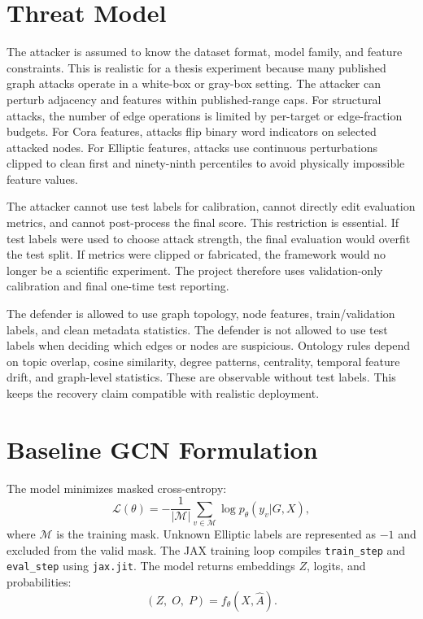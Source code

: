 \documentclass[12pt,oneside]{report}
\begin{document}
\section{Threat Model}
The attacker is assumed to know the dataset format, model family, and feature constraints. This is realistic for a thesis experiment because many published graph attacks operate in a white-box or gray-box setting. The attacker can perturb adjacency and features within published-range caps. For structural attacks, the number of edge operations is limited by per-target or edge-fraction budgets. For Cora features, attacks flip binary word indicators on selected attacked nodes. For Elliptic features, attacks use continuous perturbations clipped to clean first and ninety-ninth percentiles to avoid physically impossible feature values.

The attacker cannot use test labels for calibration, cannot directly edit evaluation metrics, and cannot post-process the final score. This restriction is essential. If test labels were used to choose attack strength, the final evaluation would overfit the test split. If metrics were clipped or fabricated, the framework would no longer be a scientific experiment. The project therefore uses validation-only calibration and final one-time test reporting.

The defender is allowed to use graph topology, node features, train/validation labels, and clean metadata statistics. The defender is not allowed to use test labels when deciding which edges or nodes are suspicious. Ontology rules depend on topic overlap, cosine similarity, degree patterns, centrality, temporal feature drift, and graph-level statistics. These are observable without test labels. This keeps the recovery claim compatible with realistic deployment.

\section{Baseline GCN Formulation}
The model minimizes masked cross-entropy:
\begin{equation}
\mathcal{L}(\theta)=-\frac{1}{|\mathcal{M}|}\sum_{v\in \mathcal{M}}\log p_\theta(y_v|G,X),
\end{equation}
where \(\mathcal{M}\) is the training mask. Unknown Elliptic labels are represented as \(-1\) and excluded from the valid mask. The JAX training loop compiles \texttt{train\_step} and \texttt{eval\_step} using \texttt{jax.jit}. The model returns embeddings \(Z\), logits, and probabilities:
\begin{equation}
(Z,\;O,\;P)=f_\theta(X,\hat{A}).
\end{equation}
\end{document}
